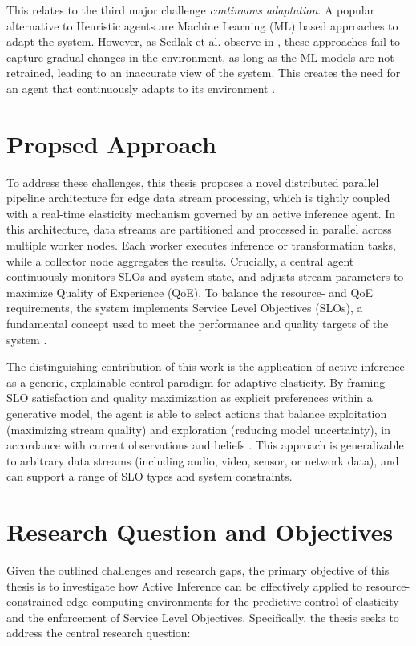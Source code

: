 This relates to the third major challenge \textit{continuous adaptation}\cite{danilenka_adaptive_2025}. A popular alternative to Heuristic agents are Machine Learning (ML) based approaches to adapt the system. However, as Sedlak et al. observe in \cite{sedlak_active_2024}, these approaches fail to capture gradual changes in the environment, as long as the ML models are not retrained, leading to an inaccurate view of the system. This creates the need for an agent that continuously adapts to its environment \cite{sedlak_equilibrium_2024}.

\section{Propsed Approach}
To address these challenges, this thesis proposes a novel distributed parallel pipeline
architecture for edge data stream processing, which is tightly coupled with a real-time elasticity
mechanism governed by an active inference agent. In this architecture, data streams are
partitioned and processed in parallel across multiple worker nodes. Each worker executes
inference or transformation tasks, while a collector node aggregates the results. Crucially, a
central agent continuously monitors SLOs and system state, and adjusts stream parameters to maximize Quality of Experience (QoE). To balance the resource- and QoE requirements, the system implements Service Level Objectives (SLOs), a fundamental concept used to meet the performance and quality targets of the system \cite{sedlak_towards_2025, nastic_sloc_2020}.

The distinguishing contribution of this work is the application of active inference as a generic,
explainable control paradigm for adaptive elasticity. By framing SLO satisfaction and quality maximization as explicit preferences within a generative model, the agent is able to select actions that balance exploitation (maximizing stream quality) and exploration (reducing model uncertainty), in accordance with current observations and beliefs \cite{casamayor_pujol_deepslos_2024, sedlak_adaptive_2024, danilenka_adaptive_2025, lanillos_active_2021}. This approach is generalizable to arbitrary data streams (including audio, video, sensor, or network
data), and can support a range of SLO types and system constraints.

\section{Research Question and Objectives}
Given the outlined challenges and research gaps, the primary objective of this thesis is to
investigate how Active Inference can be effectively applied to resource-constrained edge
computing environments for the predictive control of elasticity and the enforcement of
Service Level Objectives. Specifically, the thesis seeks to address the central research question:

